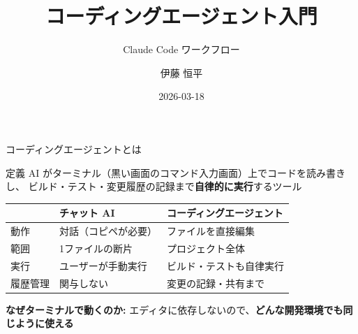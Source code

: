 \documentclass[aspectratio=169, 14pt]{beamer}
\title{コーディングエージェント入門}
\subtitle{Claude Code ワークフロー}
\author{伊藤 恒平}
\date{2026-03-18}
\begin{document}

\begin{frame}
  \titlepage
\end{frame}

\begin{frame}{コーディングエージェントとは}
  \begin{block}{定義}
    AI がターミナル（黒い画面のコマンド入力画面）上でコードを読み書きし、
    ビルド・テスト・変更履歴の記録まで\textbf{自律的に実行}するツール
  \end{block}

  \vspace{0.3em}

  \begin{table}
    \centering\small
    \begin{tabular}{lll}
      \hline
      & \textbf{チャット AI} & \textbf{コーディングエージェント} \\
      \hline
      動作     & 対話（コピペが必要）  & ファイルを直接編集 \\
      範囲     & 1ファイルの断片      & プロジェクト全体 \\
      実行     & ユーザーが手動実行    & ビルド・テストも自律実行 \\
      履歴管理 & 関与しない           & 変更の記録・共有まで \\
      \hline
    \end{tabular}
  \end{table}

  \vspace{0.3em}

  {\footnotesize \textbf{なぜターミナルで動くのか:}
    エディタに依存しないので、\textbf{どんな開発環境でも同じように使える}}
\end{frame}
\end{document}
